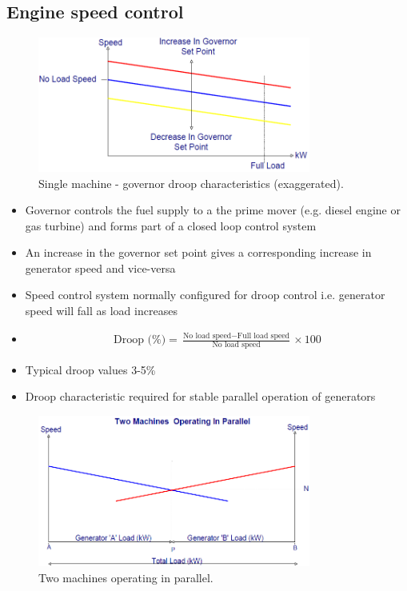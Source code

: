 \subsection{Engine speed control}
\begin{figure}[H]
    \centering
    \includegraphics[width = 0.8\textwidth]{img/figure81.png}
    \caption{Single machine - governor droop characteristics (exaggerated).}
\end{figure}
\begin{itemize}
    \item Governor controls the fuel supply to a the prime mover (e.g. diesel engine or gas turbine) and forms part of a closed loop control system
    \item An increase in the governor set point gives a corresponding increase in generator speed and vice-versa
    \item Speed control system normally configured for droop control i.e. generator speed will fall as load increases
    \item \begin{gather}
              \textrm{Droop (\%)} = \frac{\textrm{No load speed} - \textrm{Full load speed}}{\textrm{No load speed}}\times 100
          \end{gather}
    \item Typical droop values 3-5\%
    \item Droop characteristic required for stable parallel operation of generators
\end{itemize}
\begin{figure}[H]
    \centering
    \includegraphics[width = 0.8\textwidth]{img/figure82.png}
    \caption{Two machines operating in parallel.}
\end{figure}
